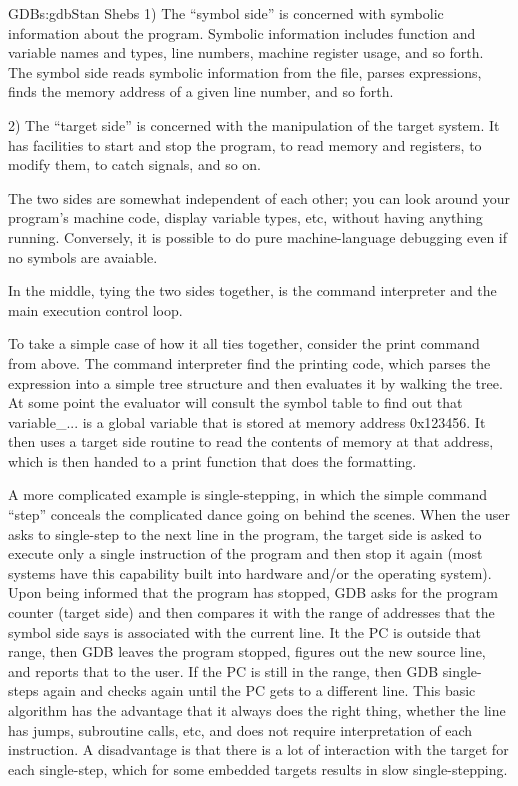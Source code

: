 \begin{aosachapter}{GDB}{s:gdb}{Stan Shebs}
1) The ``symbol side'' is concerned with symbolic information about
the program.  Symbolic information includes function and variable
names and types, line numbers, machine register usage, and so forth.
The symbol side reads symbolic information from the file, parses
expressions, finds the memory address of a given line number, and so
forth.

2) The ``target side'' is concerned with the manipulation of the
target system.  It has facilities to start and stop the program, to
read memory and registers, to modify them, to catch signals, and so
on.

The two sides are somewhat independent of each other; you can look
around your program's machine code, display variable types, etc,
without having anything running.  Conversely, it is possible to do
pure machine-language debugging even if no symbols are avaiable.

In the middle, tying the two sides together, is the command interpreter
and the main execution control loop.

To take a simple case of how it all ties together, consider the
print command from above.  The command interpreter find the printing
code, which parses the expression into a simple tree structure and
then evaluates it by walking the tree.  At some point the evaluator
will consult the symbol table to find out that variable_... is a global
variable that is stored at memory address 0x123456.  It then uses a
target side routine to read the contents of memory at that address,
which is then handed to a print function that does the formatting.

A more complicated example is single-stepping, in which the simple
command ``step'' conceals the complicated dance going on behind the
scenes.  When the user asks to single-step to the next line in the
program, the target side is asked to execute only a single instruction
of the program and then stop it again (most systems have this
capability built into hardware and/or the operating system).  Upon
being informed that the program has stopped, GDB asks for the program
counter (target side) and then compares it with the range of addresses
that the symbol side says is associated with the current line.  It the
PC is outside that range, then GDB leaves the program stopped, figures
out the new source line, and reports that to the user.  If the PC is
still in the range, then GDB single-steps again and checks again until
the PC gets to a different line.  This basic algorithm has the
advantage that it always does the right thing, whether the line has
jumps, subroutine calls, etc, and does not require interpretation of
each instruction.  A disadvantage is that there is a lot of interaction
with the target for each single-step, which for some embedded targets
results in slow single-stepping.


\end{aosachapter}

